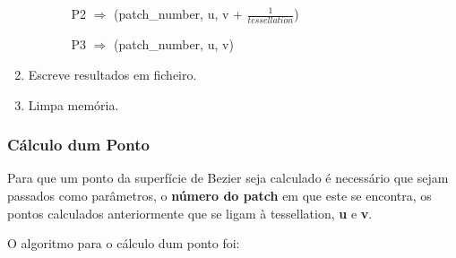 \documentclass[a4paper]{article}
\begin{document}
\begin{enumerate}
\begin{enumerate}
\begin{enumerate}
      		\vspace{0.2cm}

          	P2 $\Rightarrow$ (patch\_number, u, v + $\frac{1}{tessellation}$)

      		\vspace{0.2cm}

          	P3 $\Rightarrow$ (patch\_number, u, v)

      		\vspace{0.2cm}

	\end{enumerate}
  \end{enumerate}
  \item Escreve resultados em ficheiro.
  \item Limpa memória.
\end{enumerate}
\rmfamily


\newpage

\subsubsection{Cálculo dum Ponto}

Para que um ponto da superfície de Bezier seja calculado é necessário que sejam passados como parâmetros, o \textbf{número do patch} em que este se encontra, os pontos calculados anteriormente que se ligam à tessellation, \textbf{u} e \textbf{v}.

O algoritmo para o cálculo dum ponto foi:
\end{document}
